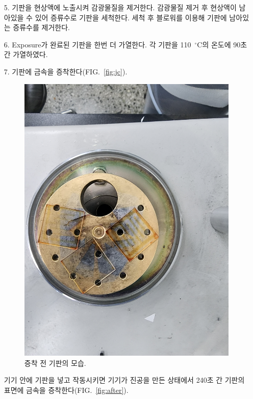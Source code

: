 \documentclass[aps,reprint,superscriptaddress,10pt]{revtex4-2}
\begin{document}
\begin{itemize}
  \item[5. ] 기판을 현상액에 노출시켜 감광물질을 제거한다.
  감광물질 제거 후 현상액이 남아있을 수 있어 증류수로 기판을 세척한다.
  세척 후 블로워를 이용해 기판에 남아있는 증류수를 제거한다.

  \item[6. ] Exposure가 완료된 기판을 한번 더 가열한다.
  각 기판을 110~$^\circ$C의 온도에 90초 간 가열하였다.

  \item[7. ] 기판에 금속을 증착한다(FIG.~\ref{fig:jc}). 

  \begin{figure}[htbp]
    \centering
    \includegraphics[scale=0.04, angle=270]{before.JPG}
    \caption{증착 전 기판의 모습.}
    \label{fig:before}
  \end{figure}
  기기 안에 기판을 넣고 작동시키면 기기가 진공을 만든 상태에서 240초 간 
  기판의 표면에 금속을 증착한다(FIG.~\ref{fig:after}).
  

\end{itemize}
\end{document}

